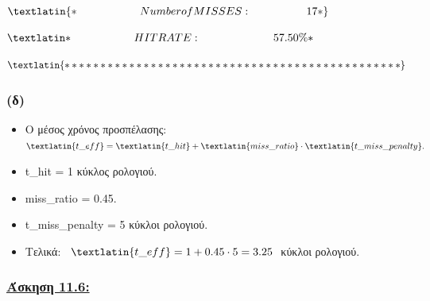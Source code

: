 \documentclass{article}
\begin{document}
$
\textlatin
{
*       \hspace{2cm}      Number of MISSES :        \hspace{1.75cm}       17 *
}
$

$
\textlatin
{
*      \hspace{2cm}       HIT RATE :          \hspace{2.3cm}         57.50\% *
}
$

$
\textlatin
{
***********************************************
}
$
 

\subsubsection*{\textbf{(δ) }}

\begin{itemize}
    \item Ο μέσος χρόνος προσπέλασης: \ $\textlatin{t\_eff} = \textlatin{t\_hit} + \textlatin{miss\_ratio} \cdot \textlatin{t\_miss\_penalty}.$
\end{itemize}

\begin{itemize}
    \item \textlatin{t\_hit} = 1 {κύκλος ρολογιού}.
        \item \textlatin{miss\_ratio} = 0.45.
    \item \textlatin{t\_miss\_penalty} = 5 {κύκλοι ρολογιού}.
    \item Τελικά: \ $\textlatin{t\_eff} = 1 + 0.45 \cdot 5 = 3.25 \ $ {κύκλοι ρολογιού.}
\end{itemize}















 

\newpage

\vspace{2.5cm}
\subsubsection*{\underline{\textbf{Άσκηση 11.6:}}}
\vspace{0.55cm}
\end{document}
